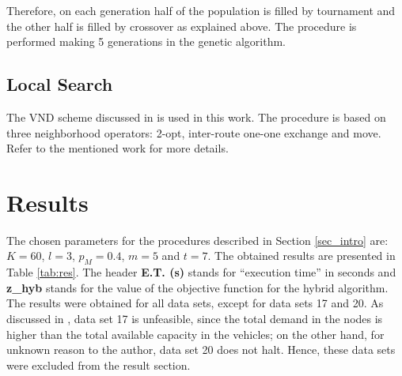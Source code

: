 \documentclass[10pt,twoside]{article}
\begin{document}
 Therefore, on each generation half of the population is filled by tournament and the other half is filled by crossover as explained above. The procedure is performed making 5 generations in the genetic algorithm.
 \subsection{Local Search}
 The VND scheme discussed in \cite{ls} is used in this work. The procedure is based on three neighborhood operators: 2-opt, inter-route one-one exchange and move. Refer to the mentioned work for more details.

 
\section{Results}
The chosen parameters for the procedures described in Section \ref{sec_intro} are: $K=60$, $l=3$, $p_M=0.4$, $m=5$ and $t=7$. The obtained results are presented in Table \ref{tab:res}. The header \textbf{E.T. (s)} stands for ``execution time'' in seconds and \textbf{z\_hyb} stands for the value of the objective function for the hybrid algorithm. The results were obtained for all data sets, except for data sets 17 and 20. As discussed in \cite{random}, data set 17 is unfeasible, since the total demand in the nodes is higher than the total available capacity in the vehicles; on the other hand, for unknown reason to the author, data set 20 does not halt. Hence, these data sets were excluded from the result section.
\end{document}
